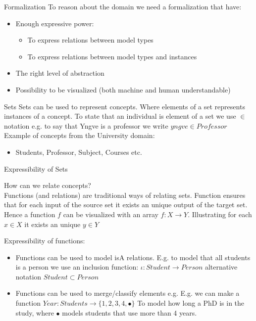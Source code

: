 \documentclass[slidetop,mathserif,red]{beamer}
\begin{document}
\begin{frame}{Formalization}
To reason about the domain we need a formalization that have:
\begin{itemize}
\item Enough expressive power:
	\begin{itemize}
	\item To express relations between model types
	\item To express relations between model types and instances
	\end{itemize}
\item The right level of abstraction
\item Possibility to be visualized (both machine and human understandable)
\end{itemize} 
\end{frame}

\begin{frame}{Sets}
Sets can be used to represent concepts. Where elements of a set represents instances of a concept.  To state that an individual is element of a set we use $\in$ notation e.g. to say that Yngve is a professor we write $yngve \in Professor$\\
Example of concepts from the University domain:
\begin{itemize}
\item Students, Professor, Subject, Courses etc. 
\end{itemize} 


\end{frame}



\begin{frame}{Expressibility of Sets}

How can we relate concepts?\\
Functions (and relations) are traditional ways of relating sets.
Function ensures that for each input of the source set it exists an unique output of the target set. Hence a function $f$ can be visualized with an array $f: X \to Y$. Illustrating for each $x \in X$ it exists an unique $y \in Y$ 

Expressibility of functions:
\begin{itemize}
\item Functions can be used to model isA relations. E.g. to model that all students is a person we use an inclusion function: $\iota: Student \to Person$
alternative notation $Student \subset Person$

\item Functions can be used to merge/classify elements
e.g.  E.g. we can make a function $Year: Students \to \{ 1,2,3, 4,  \bullet \}$ To model how long  a PhD is in the study, where $\bullet$ models students that use more than 4 years. 
\end{itemize}
\end{frame}
\end{document}
